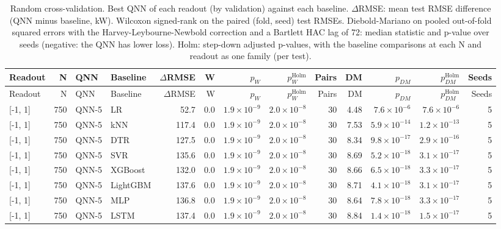 \begin{longtable}{lrllrrrrrrrrr}
\caption{Random cross-validation. Best QNN of each readout (by validation) against each baseline. $\Delta$RMSE: mean test RMSE difference (QNN minus baseline, kW). Wilcoxon signed-rank on the paired (fold, seed) test RMSEs. Diebold-Mariano on pooled out-of-fold squared errors with the Harvey-Leybourne-Newbold correction and a Bartlett HAC lag of 72: median statistic and p-value over seeds (negative: the QNN has lower loss). Holm: step-down adjusted p-values, with the baseline comparisons at each N and readout as one family (per test).}\label{tab:t6r} \\
\toprule
Readout & N & QNN & Baseline & $\Delta$RMSE & W & $p_W$ & $p_W^{\mathrm{Holm}}$ & Pairs & DM & $p_{DM}$ & $p_{DM}^{\mathrm{Holm}}$ & Seeds \\
\midrule
\endfirsthead
\toprule
Readout & N & QNN & Baseline & $\Delta$RMSE & W & $p_W$ & $p_W^{\mathrm{Holm}}$ & Pairs & DM & $p_{DM}$ & $p_{DM}^{\mathrm{Holm}}$ & Seeds \\
\midrule
\endhead
\bottomrule
\endlastfoot
{[-1, 1]} & 750 & QNN-5 & LR & 52.7 & 0.0 & $1.9 \times 10^{-9}$ & $2.0 \times 10^{-8}$ & 30 & 4.48 & $7.6 \times 10^{-6}$ & $7.6 \times 10^{-6}$ & 5 \\
{[-1, 1]} & 750 & QNN-5 & kNN & 117.4 & 0.0 & $1.9 \times 10^{-9}$ & $2.0 \times 10^{-8}$ & 30 & 7.53 & $5.9 \times 10^{-14}$ & $1.2 \times 10^{-13}$ & 5 \\
{[-1, 1]} & 750 & QNN-5 & DTR & 127.5 & 0.0 & $1.9 \times 10^{-9}$ & $2.0 \times 10^{-8}$ & 30 & 8.34 & $9.8 \times 10^{-17}$ & $2.9 \times 10^{-16}$ & 5 \\
{[-1, 1]} & 750 & QNN-5 & SVR & 135.6 & 0.0 & $1.9 \times 10^{-9}$ & $2.0 \times 10^{-8}$ & 30 & 8.69 & $5.2 \times 10^{-18}$ & $3.1 \times 10^{-17}$ & 5 \\
{[-1, 1]} & 750 & QNN-5 & XGBoost & 132.0 & 0.0 & $1.9 \times 10^{-9}$ & $2.0 \times 10^{-8}$ & 30 & 8.66 & $6.5 \times 10^{-18}$ & $3.3 \times 10^{-17}$ & 5 \\
{[-1, 1]} & 750 & QNN-5 & LightGBM & 137.6 & 0.0 & $1.9 \times 10^{-9}$ & $2.0 \times 10^{-8}$ & 30 & 8.71 & $4.1 \times 10^{-18}$ & $3.1 \times 10^{-17}$ & 5 \\
{[-1, 1]} & 750 & QNN-5 & MLP & 136.8 & 0.0 & $1.9 \times 10^{-9}$ & $2.0 \times 10^{-8}$ & 30 & 8.64 & $7.8 \times 10^{-18}$ & $3.3 \times 10^{-17}$ & 5 \\
{[-1, 1]} & 750 & QNN-5 & LSTM & 137.4 & 0.0 & $1.9 \times 10^{-9}$ & $2.0 \times 10^{-8}$ & 30 & 8.84 & $1.4 \times 10^{-18}$ & $1.5 \times 10^{-17}$ & 5 \\

\end{longtable}
